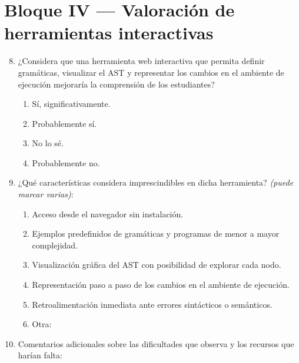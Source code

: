 \section*{Bloque IV — Valoración de herramientas interactivas}

\begin{enumerate}
    \setcounter{enumi}{7}

    \item ¿Considera que una herramienta web interactiva que permita definir gramáticas, visualizar el AST y representar los cambios en el ambiente de ejecución mejoraría la comprensión de los estudiantes?
    \begin{enumerate}
        \item Sí, significativamente.
        \item Probablemente sí.
        \item No lo sé.
        \item Probablemente no.
    \end{enumerate}

    \item ¿Qué características considera imprescindibles en dicha herramienta? \textit{(puede marcar varias)}:
    \begin{enumerate}
        \item Acceso desde el navegador sin instalación.
        \item Ejemplos predefinidos de gramáticas y programas de menor a mayor complejidad.
        \item Visualización gráfica del AST con posibilidad de explorar cada nodo.
        \item Representación paso a paso de los cambios en el ambiente de ejecución.
        \item Retroalimentación inmediata ante errores sintácticos o semánticos.
        \item Otra: \underline{\hspace{6cm}}
    \end{enumerate}

    \item Comentarios adicionales sobre las dificultades que observa y los recursos que harían falta: \underline{\hspace{12cm}}

    \underline{\hspace{14cm}}
\end{enumerate}
